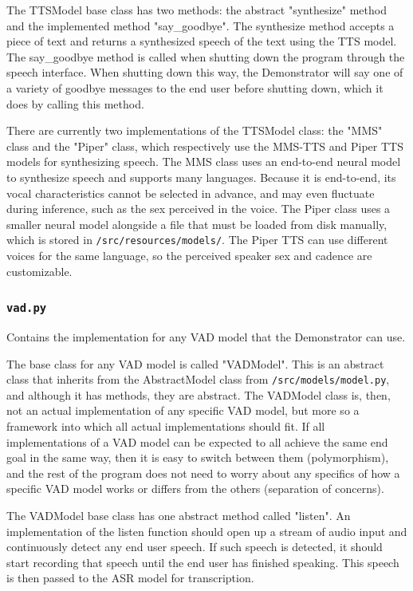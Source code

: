 The TTSModel base class has two methods: the abstract "synthesize" method and the implemented method "say\_goodbye".
The synthesize method accepts a piece of text and returns a synthesized speech of the text using the TTS model.
The say\_goodbye method is called when shutting down the program through the speech interface.
When shutting down this way, the Demonstrator will say one of a variety of goodbye messages to the end user before shutting down, which it does by calling this method.

There are currently two implementations of the TTSModel class: the "MMS" class and the "Piper" class, which respectively use the MMS-TTS and Piper TTS models for synthesizing speech.
The MMS class uses an end-to-end neural model to synthesize speech and supports many languages.
Because it is end-to-end, its vocal characteristics cannot be selected in advance, and may even fluctuate during inference, such as the sex perceived in the voice.
The Piper class uses a smaller neural model alongside a file that must be loaded from disk manually, which is stored in \texttt{/src/resources/models/}.
The Piper TTS can use different voices for the same language, so the perceived speaker sex and cadence are customizable.

\subsubsection{\texttt{vad.py}}
Contains the implementation for any VAD model that the Demonstrator can use.

The base class for any VAD model is called "VADModel".
This is an abstract class that inherits from the AbstractModel class from \texttt{/src/models/model.py}, and although it has methods, they are abstract.
The VADModel class is, then, not an actual implementation of any specific VAD model, but more so a framework into which all actual implementations should fit.
If all implementations of a VAD model can be expected to all achieve the same end goal in the same way, then it is easy to switch between them (polymorphism), and the rest of the program does not need to worry about any specifics of how a specific VAD model works or differs from the others (separation of concerns).

The VADModel base class has one abstract method called "listen".
An implementation of the listen function should open up a stream of audio input and continuously detect any end user speech.
If such speech is detected, it should start recording that speech until the end user has finished speaking.
This speech is then passed to the ASR model for transcription.

